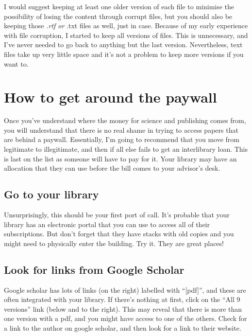\documentclass[
]{krantz}
\begin{document}
I would suggest keeping at least one older version of each file to minimise the possibility of losing the content through corrupt files, but you should also be keeping those \emph{.rtf or }.txt files as well, just in case. Because of my early experience with file corruption, I started to keep all versions of files. This is unnecessary, and I've never needed to go back to anything but the last version. Nevertheless, text files take up very little space and it's not a problem to keep more versions if you want to.

\hypertarget{paywall}{%
\section{How to get around the paywall}\label{paywall}}

Once you've understand where the money for science and publishing comes from, you will understand that there is no real shame in trying to access papers that are behind a paywall. Essentially, I'm going to recommend that you move from legitimate to illegitimate, and then if all else fails to get an interlibrary loan. This is last on the list as someone will have to pay for it. Your library may have an allocation that they can use before the bill comes to your advisor's desk.

\hypertarget{go-to-your-library}{%
\subsection{Go to your library}\label{go-to-your-library}}

Unsurprisingly, this should be your first port of call. It's probable that your library has an electronic portal that you can use to access all of their subscriptions. But don't forget that they have stacks with old copies and you might need to physically enter the building. Try it. They are great places!

\hypertarget{look-for-links-from-google-scholar}{%
\subsection{Look for links from Google Scholar}\label{look-for-links-from-google-scholar}}

Google scholar has lots of links (on the right) labelled with ``{[}pdf{]}'', and these are often integrated with your library. If there's nothing at first, click on the ``All 9 versions'' link (below and to the right). This may reveal that there is more than one version with a pdf, and you might have access to one of the others. Check for a link to the author on google scholar, and then look for a link to their website.
\end{document}

